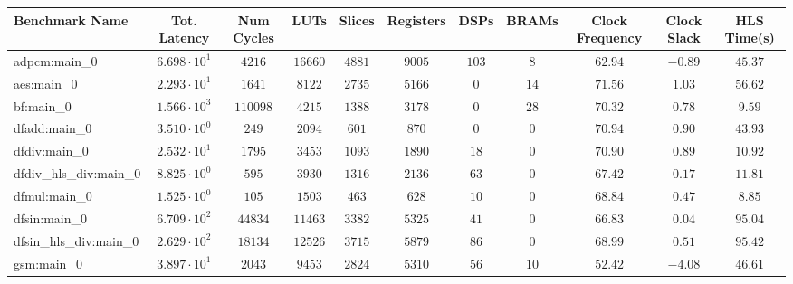 \begin{tabular}{|l|c|c|c|c|c|c|c|c|c|c|}
\hline
Benchmark Name          & Tot. Latency           & Num Cycles & LUTs       & Slices    & Registers & DSPs    & BRAMs   & Clock Frequency & Clock Slack & HLS Time(s) \\
\hline
adpcm:main\_0           & $ 6.698 \cdot 10^{1} $ & $ 4216   $ & $ 16660  $ & $ 4881  $ & $ 9005  $ & $ 103 $ & $ 8   $ & $ 62.94       $ & $ -0.89   $ & $ 45.37   $ \\
aes:main\_0             & $ 2.293 \cdot 10^{1} $ & $ 1641   $ & $ 8122   $ & $ 2735  $ & $ 5166  $ & $ 0   $ & $ 14  $ & $ 71.56       $ & $ 1.03    $ & $ 56.62   $ \\
bf:main\_0              & $ 1.566 \cdot 10^{3} $ & $ 110098 $ & $ 4215   $ & $ 1388  $ & $ 3178  $ & $ 0   $ & $ 28  $ & $ 70.32       $ & $ 0.78    $ & $ 9.59    $ \\
dfadd:main\_0           & $ 3.510 \cdot 10^{0} $ & $ 249    $ & $ 2094   $ & $ 601   $ & $ 870   $ & $ 0   $ & $ 0   $ & $ 70.94       $ & $ 0.90    $ & $ 43.93   $ \\
dfdiv:main\_0           & $ 2.532 \cdot 10^{1} $ & $ 1795   $ & $ 3453   $ & $ 1093  $ & $ 1890  $ & $ 18  $ & $ 0   $ & $ 70.90       $ & $ 0.89    $ & $ 10.92   $ \\
dfdiv\_hls\_div:main\_0 & $ 8.825 \cdot 10^{0} $ & $ 595    $ & $ 3930   $ & $ 1316  $ & $ 2136  $ & $ 63  $ & $ 0   $ & $ 67.42       $ & $ 0.17    $ & $ 11.81   $ \\
dfmul:main\_0           & $ 1.525 \cdot 10^{0} $ & $ 105    $ & $ 1503   $ & $ 463   $ & $ 628   $ & $ 10  $ & $ 0   $ & $ 68.84       $ & $ 0.47    $ & $ 8.85    $ \\
dfsin:main\_0           & $ 6.709 \cdot 10^{2} $ & $ 44834  $ & $ 11463  $ & $ 3382  $ & $ 5325  $ & $ 41  $ & $ 0   $ & $ 66.83       $ & $ 0.04    $ & $ 95.04   $ \\
dfsin\_hls\_div:main\_0 & $ 2.629 \cdot 10^{2} $ & $ 18134  $ & $ 12526  $ & $ 3715  $ & $ 5879  $ & $ 86  $ & $ 0   $ & $ 68.99       $ & $ 0.51    $ & $ 95.42   $ \\
gsm:main\_0             & $ 3.897 \cdot 10^{1} $ & $ 2043   $ & $ 9453   $ & $ 2824  $ & $ 5310  $ & $ 56  $ & $ 10  $ & $ 52.42       $ & $ -4.08   $ & $ 46.61   $ \\

\end{tabular}
